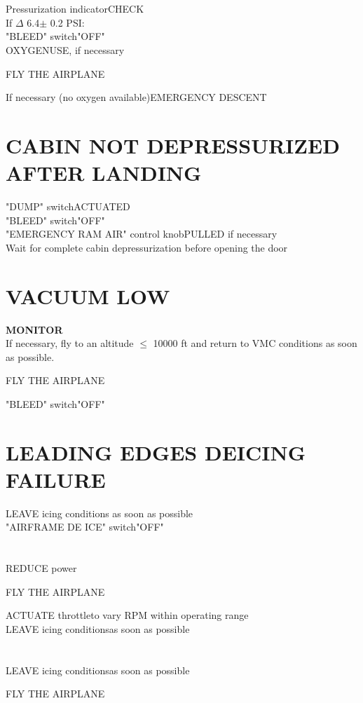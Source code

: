 \documentclass{article}
\newcommand{\fly}{\vspace{-1em}\begin{center}\color{Green}FLY THE AIRPLANE\end{center}\vspace{-1em}}
\begin{document}
\begin{multicols*}{2}
\section*{\color{Red}{CABIN DIFF PRESS}}
Pressurization indicator\dotfill CHECK\\
If $\Delta$ 6.4$\pm$ 0.2 PSI:\\
\hspace*{6mm} "BLEED" switch\dotfill "OFF"\\
\hspace*{6mm} OXYGEN\dotfill USE, if necessary\\
\vspace{-.8em}
\fly
\vspace{.4em}
If necessary (no oxygen available)\dotfill EMERGENCY DESCENT\\
\section*{CABIN NOT DEPRESSURIZED AFTER LANDING}
"DUMP" switch\dotfill ACTUATED\\
"BLEED" switch\dotfill "OFF"\\
"EMERGENCY RAM AIR" control knob\dotfill PULLED if necessary\\
Wait for complete cabin depressurization before opening the door
\vfill\null
\section*{VACUUM LOW}
\textbf{MONITOR}\\
If necessary, fly to an altitude $\leq$ 10000 ft and return to VMC conditions as soon as
possible.
\fly
"BLEED" switch\dotfill "OFF"
\section*{LEADING EDGES DEICING FAILURE}
LEAVE icing conditions as soon as possible\\
"AIRFRAME DE ICE" switch\dotfill "OFF"
\section*{\color{Orange}{PROP DEICE FAIL}}
REDUCE power
\fly
ACTUATE throttle\dotfill to vary RPM within operating range\\
LEAVE icing conditions\dotfill as soon as possible
\section*{\color{Orange}{INERT SEP FAIL}}
LEAVE icing conditions\dotfill as soon as possible
\fly

\end{multicols*}
\end{document}
